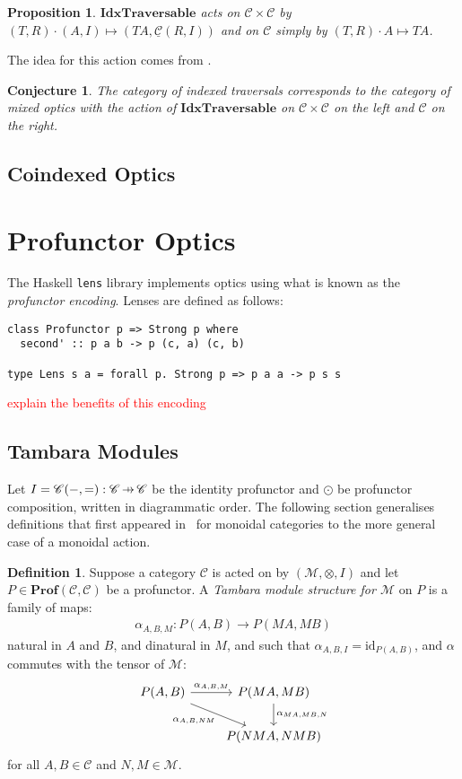 \documentclass[11pt,letterpaper]{article}
\theoremstyle{plain}
\newtheorem{proposition}[theorem]{Proposition}
\newtheorem{conjecture}[theorem]{Conjecture}
\theoremstyle{definition}
\newtheorem{definition}[theorem]{Definition}
\newcommand{\C}{\mathscr{C}}
\newcommand{\homC}{\underline{\C}}
\newcommand{\M}{\mathscr{M}}
\newcommand{\lenslib}{\texttt{lens}}
\newcommand{\Prof}{\mathbf{Prof}}
\newcommand{\IdxTraversable}{\mathbf{IdxTraversable}}
\newcommand{\id}{\mathrm{id}}
\newcommand{\act}{\cdot}
\newcommand{\hto}{\ensuremath{\,\mathaccent\shortmid\rightarrow\,}}
\newcommand{\todo}[1]{\textcolor{red}{\small #1}}
\begin{document}
\begin{proposition}
$\IdxTraversable$ acts on $\C \times \C$ by $(T, R) \act (A, I) \mapsto (TA, \homC(R, I))$ and on $\C$ simply by $(T, R) \act A \mapsto TA$.
\end{proposition}

The idea for this action comes from \cite{IndexedOpticsPost}.

\begin{conjecture}
The category of indexed traversals corresponds to the category of mixed optics with the action of $\IdxTraversable$ on $\C \times \C$ on the left and $\C$ on the right.
\end{conjecture}

\subsection{Coindexed Optics}

\section{Profunctor Optics}\label{sec:profunctor-optics}
The Haskell \lenslib{} library implements optics using what is known as the \emph{profunctor encoding}. Lenses are defined as follows:

\begin{verbatim}
class Profunctor p => Strong p where
  second' :: p a b -> p (c, a) (c, b)

type Lens s a = forall p. Strong p => p a a -> p s s
\end{verbatim}

\todo{explain the benefits of this encoding}

\subsection{Tambara Modules}
Let $I = \C(-,{=}) : \C \hto \C$ be the identity profunctor and $\odot$ be profunctor composition, written in diagrammatic order. The following section generalises definitions that first appeared in~\cite[Section 3]{Doubles} for monoidal categories to the more general case of a monoidal action.

\begin{definition}
  Suppose a category $\C$ is acted on by $(\M, \otimes, I)$ and let $P \in \Prof(\C, \C)$ be a profunctor. A \emph{Tambara module structure for $\M$} on $P$ is a family of maps:
  \begin{align*}
    \alpha_{A,B,M} : P(A,B) \to P(MA, MB)
  \end{align*}
  natural in $A$ and $B$, and dinatural in $M$, and such that $\alpha_{A,B,I} = \id_{P(A,B)}$, and $\alpha$ commutes with the tensor of $\M$:
  \[
    \begin{tikzcd}
      P(A,B) \ar[r, "\alpha_{A,B,M}"] \ar[dr, "\alpha_{A, B, NM}" below left] & P(MA, MB) \ar[d, "\alpha_{MA, MB, N}" right] \\
      & P(NMA, NMB)
    \end{tikzcd}
  \]
  for all $A, B \in \C$ and $N, M \in \M$.
\end{definition}
\end{document}
